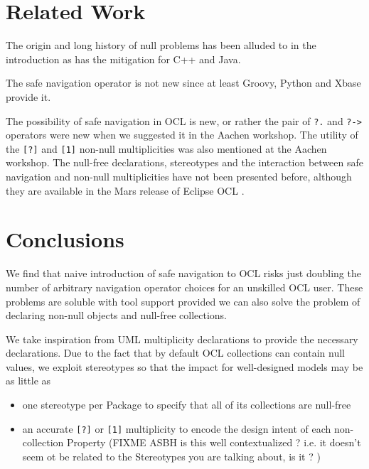 \documentclass{llncs}
\begin{document}
\section{Related Work}\label{Related Work}

The origin and long history of null problems has been alluded to in the introduction as has the mitigation for C++ and Java.

The safe navigation operator is not new since at least Groovy, Python and Xbase provide it.

The possibility of safe navigation in OCL is new, or rather the pair of \verb$?.$ and \verb$?->$ operators were new when we suggested it in the Aachen workshop\cite{aachen}. The utility of the \verb$[?]$ and \verb$[1]$ non-null multiplicities was also mentioned at the Aachen workshop. The null-free declarations, stereotypes and the interaction between safe navigation and non-null multiplicities have not been presented before, although they are available in the Mars release of Eclipse OCL \cite{Mars-OCL}. 
%
\section{Conclusions}\label{Conclusions}
%
We find that naive introduction of safe navigation to OCL risks just doubling the number of arbitrary navigation operator choices for an unskilled OCL user. These problems are soluble with tool support provided we can also solve the problem of declaring non-null objects and null-free collections.

We take inspiration from UML multiplicity declarations to provide the necessary declarations. Due to the fact that by default OCL collections can contain null values, we exploit stereotypes so that the impact for well-designed models may be as little as 
\begin{itemize}
\item one stereotype per Package to specify that all of its collections are null-free
\item an accurate \verb$[?]$ or \verb$[1]$ multiplicity to encode the design intent of each non-collection Property (FIXME ASBH is this well contextualized ? i.e. it doesn't seem ot be related to the Stereotypes you are talking about, is it ? )
\end{itemize}
\end{document}
